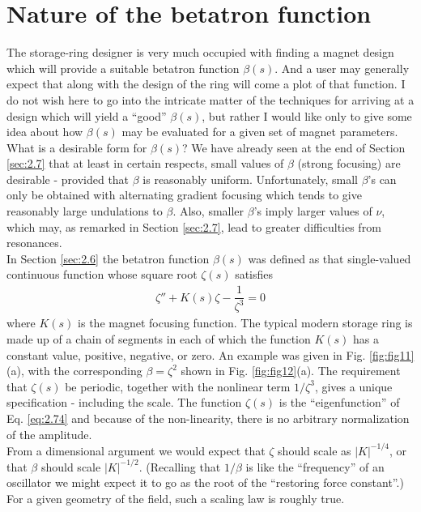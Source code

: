 \section{Nature of the betatron function}\label{sec:2.9}

The storage-ring designer is very much occupied with finding a magnet design which will provide a suitable betatron function $\beta(s)$. And a user may generally expect that along with the design of the ring will come a plot of that function.  I do not wish here to go into the intricate matter
 of the techniques for arriving at a design which will yield a ``good'' $\beta(s)$, but rather I would like only to give some idea about how $\beta(s)$ may be evaluated for a given set of magnet parameters. \\
What is a desirable form for $\beta(s)$? We have already seen at the end of Section \ref{sec:2.7} that at least in certain respects, small values of $\beta$ (strong focusing) are desirable - provided that $\beta$ is reasonably uniform. Unfortunately, small $\beta$'s can only be obtained with alternating gradient focusing which tends to give reasonably large undulations to $\beta$. Also, smaller $\beta$'s imply larger values of $\nu$, which may, as remarked in Section \ref{sec:2.7}, lead to greater difficulties from resonances. \\
In Section \ref{sec:2.6} the betatron function $\beta(s)$ was defined as that single-valued continuous function whose square root $\zeta(s)$ satisfies
\begin{align} \label{eq:2.74}
	\zeta''+K(s)\zeta-\dfrac{1}{\zeta^3}=0
\end{align}
where $K(s)$ is the magnet focusing function. The typical modern storage ring is made up of a chain of segments in each of which the function $K(s)$ has a constant value, positive, negative,
 or zero. An example was given in Fig. \ref{fig:fig11}(a), with the corresponding $\beta=\zeta^2$ shown in Fig. \ref{fig:fig12}(a).
The requirement that $\zeta(s)$ be periodic, together with the nonlinear term $1/\zeta^3$, gives a unique specification - including the scale. The function $\zeta(s)$ is the “eigenfunction” of Eq. \eqref{eq:2.74} and because of the non-linearity, there is no arbitrary normalization of the amplitude. \\
From a dimensional argument we would expect that $\zeta$ should scale as $|K|^{-1/4}$, or that $\beta$ should scale $|K|^{-1/2}$. (Recalling that $1/\beta$ is like the ``frequency'' of an
oscillator we might expect it to go as the root of the “restoring force constant”.) For a given geometry of the field, such a scaling law is roughly true. \\
